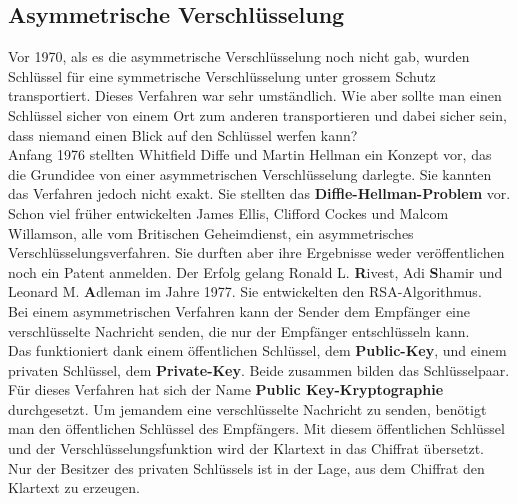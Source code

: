 \subsection{Asymmetrische Verschlüsselung}
Vor 1970, als es die asymmetrische Verschlüsselung noch nicht gab, wurden Schlüssel für eine symmetrische Verschlüsselung unter grossem Schutz transportiert.
%
Dieses Verfahren war sehr umständlich. %
Wie aber sollte man einen Schlüssel sicher von einem Ort zum anderen transportieren und dabei sicher sein, dass niemand einen Blick auf den Schlüssel werfen kann?\\
%
Anfang 1976 stellten Whitfield Diffe und Martin Hellman ein Konzept vor, das die Grundidee von einer asymmetrischen Verschlüsselung darlegte. Sie kannten das Verfahren jedoch nicht exakt. Sie stellten das \textbf{Diffle-Hellman-Problem} vor. \cite{rsa_and_public_key}\\ %
Schon viel früher entwickelten James Ellis, Clifford Cockes und Malcom Willamson, alle vom Britischen Geheimdienst, ein asymmetrisches Verschlüsselungsverfahren. Sie durften aber ihre Ergebnisse weder veröffentlichen noch ein Patent anmelden. 
Der Erfolg gelang Ronald L. \textbf{R}ivest, Adi \textbf{S}hamir und Leonard M. \textbf{A}dleman im Jahre 1977. Sie entwickelten den RSA-Algorithmus.\\[2ex]
%
Bei einem asymmetrischen Verfahren kann der Sender dem Empfänger eine verschlüsselte Nachricht senden, die nur der Empfänger entschlüsseln kann.\\
%
Das funktioniert dank einem öffentlichen Schlüssel, dem \textbf{Public-Key}, und einem privaten Schlüssel, dem \textbf{Private-Key}. Beide zusammen bilden das Schlüsselpaar.\\
Für dieses Verfahren hat sich der Name \textbf{Public Key-Kryptographie} durchgesetzt.
%
%
Um jemandem eine verschlüsselte Nachricht zu senden, benötigt man den öffentlichen Schlüssel des Empfängers. Mit diesem öffentlichen Schlüssel und der Verschlüsselungsfunktion wird der Klartext in das Chiffrat übersetzt. Nur der Besitzer des privaten Schlüssels ist in der Lage, aus dem Chiffrat den Klartext zu erzeugen.\\
